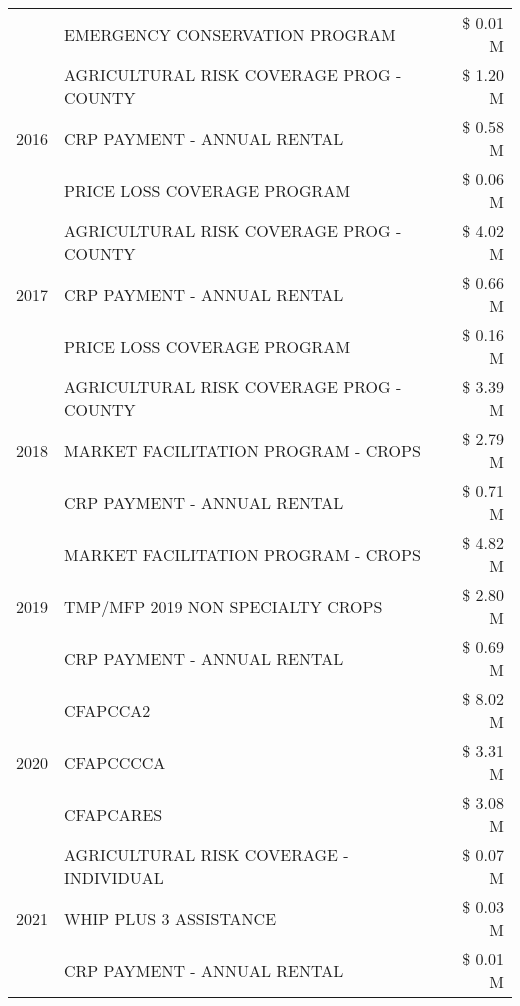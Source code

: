 \begin{tabular}{llr}
 & EMERGENCY CONSERVATION PROGRAM & \$ 0.01 M \\
\cline{1-3}
\multirow[t]{3}{*}{2016} & AGRICULTURAL RISK COVERAGE PROG - COUNTY & \$ 1.20 M \\
 & CRP PAYMENT - ANNUAL RENTAL & \$ 0.58 M \\
 & PRICE LOSS COVERAGE PROGRAM & \$ 0.06 M \\
\cline{1-3}
\multirow[t]{3}{*}{2017} & AGRICULTURAL RISK COVERAGE PROG - COUNTY & \$ 4.02 M \\
 & CRP PAYMENT - ANNUAL RENTAL & \$ 0.66 M \\
 & PRICE LOSS COVERAGE PROGRAM & \$ 0.16 M \\
\cline{1-3}
\multirow[t]{3}{*}{2018} & AGRICULTURAL RISK COVERAGE PROG - COUNTY & \$ 3.39 M \\
 & MARKET FACILITATION PROGRAM - CROPS & \$ 2.79 M \\
 & CRP PAYMENT - ANNUAL RENTAL & \$ 0.71 M \\
\cline{1-3}
\multirow[t]{3}{*}{2019} & MARKET FACILITATION PROGRAM - CROPS & \$ 4.82 M \\
 & TMP/MFP 2019 NON SPECIALTY CROPS & \$ 2.80 M \\
 & CRP PAYMENT - ANNUAL RENTAL & \$ 0.69 M \\
\cline{1-3}
\multirow[t]{3}{*}{2020} & CFAPCCA2 & \$ 8.02 M \\
 & CFAPCCCCA & \$ 3.31 M \\
 & CFAPCARES & \$ 3.08 M \\
\cline{1-3}
\multirow[t]{3}{*}{2021} & AGRICULTURAL RISK COVERAGE - INDIVIDUAL & \$ 0.07 M \\
 & WHIP PLUS 3 ASSISTANCE & \$ 0.03 M \\
 & CRP PAYMENT - ANNUAL RENTAL & \$ 0.01 M \\
\cline{1-3}
\bottomrule
\end{tabular}
